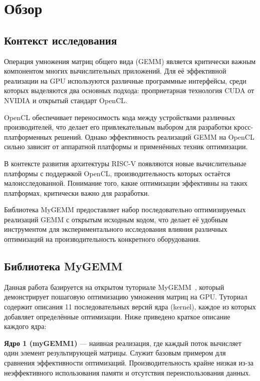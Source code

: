 
\section{Обзор}
\label{sec:relatedworks}

\subsection{Контекст исследования}

Операция умножения матриц общего вида (GEMM) является критически важным компонентом многих вычислительных приложений. Для её эффективной реализации на GPU используются различные программные интерфейсы, среди которых выделяются два основных подхода: проприетарная технология CUDA от NVIDIA и открытый стандарт OpenCL.

OpenCL обеспечивает переносимость кода между устройствами различных производителей, что делает его привлекательным выбором для разработки кросс-платформенных решений. Однако эффективность реализаций GEMM на OpenCL сильно зависит от аппаратной платформы и применённых техник оптимизации.

В контексте развития архитектуры RISC-V появляются новые вычислительные платформы с поддержкой OpenCL, производительность которых остаётся малоисследованной. Понимание того, какие оптимизации эффективны на таких платформах, критически важно для разработки.

Библиотека MyGEMM предоставляет набор последовательно оптимизируемых реализаций GEMM с открытым исходным кодом, что делает её удобным инструментом для экспериментального исследования влияния различных оптимизаций на производительность конкретного оборудования.

\subsection{Библиотека MyGEMM}

Данная работа базируется на открытом туториале MyGEMM~\cite{nugteren2018mygemm}, который демонстрирует пошаговую оптимизацию умножения матриц на GPU. Туториал содержит описания 11 последовательных версий ядра (kernel), каждое из которых добавляет определённые оптимизации. Ниже приведено краткое описание каждого ядра:

\textbf{Ядро 1 (myGEMM1)} --- наивная реализация, где каждый поток вычисляет один элемент результирующей матрицы. Служит базовым примером для сравнения эффективности оптимизаций. Производительность крайне низкая из-за неэффективного использования памяти и отсутствия переиспользования данных.

